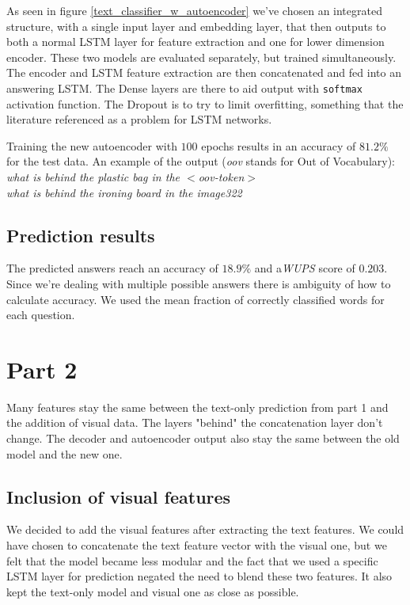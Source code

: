 \documentclass[10pt,a4paper]{report}
\begin{document}
	As seen in figure \ref{text_classifier_w_autoencoder} we've chosen an integrated structure, with a single input layer and embedding layer, that then outputs to both a normal LSTM layer for feature extraction and one for lower dimension encoder. These two models are evaluated separately, but trained simultaneously. The encoder and LSTM feature extraction are then concatenated and fed into an answering LSTM. The Dense layers are there to aid output with \texttt{softmax} activation function. The Dropout is to try to limit overfitting, something that the literature referenced as a problem for LSTM networks.
	
	Training the new autoencoder with $ 100 $ epochs results in an accuracy of $ 81.2 \%$ for the test data.  An example of the output (\textit{oov} stands for Out of Vocabulary):
	\\\textit{what is behind the plastic bag in the $ < $oov-token$ > $
	\\ what is behind the ironing board in the image322  }

	\subsection*{Prediction results}
	The predicted answers reach an accuracy of $ 18.9 \% $ and a\textit{WUPS} score of  $ 0.203 $. Since we're dealing with multiple possible answers there is ambiguity of how to calculate accuracy. We used the mean fraction of correctly classified words for each question.


\pagebreak



	\section*{Part 2}
	Many features stay the same between the text-only prediction from part 1 and the addition of visual data. The layers "behind" the concatenation layer don't change. The decoder and autoencoder output also stay the same between the old model and the new one.
	\subsection*{Inclusion of visual features}
	We decided to add the visual features after extracting the text features. We could have chosen to concatenate the text feature vector with the visual one, but we felt that the model became less modular and the fact that we used a specific LSTM layer for prediction negated the need to blend these two features. It also kept the text-only model and visual one as close as possible. 
\end{document}
